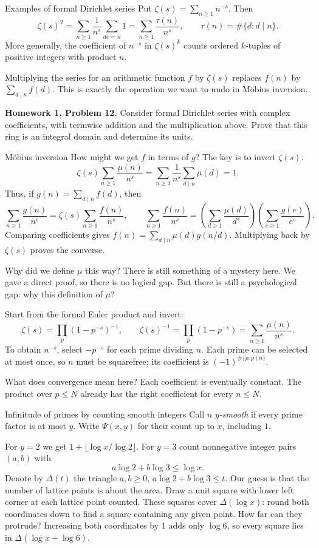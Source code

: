 \documentclass[aspectratio=169,11pt]{beamer}
\newcommand{\HW}[2]{{\color{teal}\textbf{Homework #1, Problem #2.}}}
\begin{document}
\begin{frame}{Examples of formal Dirichlet series}
Put $\zeta(s)=\sum_{n\ge1}n^{-s}$. Then
\[
\zeta(s)^2=\sum_{n\ge1}\frac1{n^s}\sum_{de=n}1
=\sum_{n\ge1}\frac{\tau(n)}{n^s},
\qquad \tau(n)=\#\{d:d\mid n\}.
\]
More generally, the coefficient of $n^{-s}$ in $\zeta(s)^k$ counts ordered $k$-tuples of positive integers with product $n$.

Multiplying the series for an arithmetic function $f$ by $\zeta(s)$ replaces $f(n)$ by $\sum_{d\mid n}f(d)$. This is exactly the operation we want to undo in M\"obius inversion.

\HW{1}{12} Consider formal Dirichlet series with complex coefficients, with termwise addition and the multiplication above. Prove that this ring is an integral domain and determine its units.
\end{frame}
\begin{frame}{M\"obius inversion}
How might we get $f$ in terms of $g$? The key is to invert $\zeta(s)$.
\[
\zeta(s)\sum_{n\ge1}\frac{\mu(n)}{n^s}
=\sum_{n\ge1}\frac1{n^s}\sum_{d\mid n}\mu(d)=1.
\]
Thus, if $g(n)=\sum_{d\mid n}f(d)$, then
\[
\sum_{n\ge1}\frac{g(n)}{n^s}=\zeta(s)\sum_{n\ge1}\frac{f(n)}{n^s},\qquad
\sum_{n\ge1}\frac{f(n)}{n^s}=\left(\sum_{d\ge1}\frac{\mu(d)}{d^s}\right)\left(\sum_{e\ge1}\frac{g(e)}{e^s}\right).
\]
Comparing coefficients gives $f(n)=\sum_{d\mid n}\mu(d)g(n/d)$. Multiplying back by $\zeta(s)$ proves the converse.
\end{frame}
\begin{frame}{Why did we define $\mu$ this way?}
There is still something of a mystery here. We gave a direct proof, so there is no logical gap. But there is still a psychological gap: why this definition of $\mu$?

Start from the formal Euler product and invert:
\[\zeta(s)=\prod_p(1-p^{-s})^{-1},\qquad
\zeta(s)^{-1}=\prod_p(1-p^{-s})=\sum_{n\ge1}\frac{\mu(n)}{n^s}.\]
To obtain $n^{-s}$, select $-p^{-s}$ for each prime dividing $n$. Each prime can be selected at most once, so $n$ must be squarefree; its coefficient is $(-1)^{\#\{p:p\mid n\}}$.

What does convergence mean here? Each coefficient is eventually constant. The product over $p\le N$ already has the right coefficient for every $n\le N$.
\end{frame}
\begin{frame}{Infinitude of primes by counting smooth integers}
Call $n$ \emph{$y$-smooth} if every prime factor is at most $y$. Write $\Psi(x,y)$ for their count up to $x$, including $1$.

For $y=2$ we get $1+\lfloor\log x/\log2\rfloor$. For $y=3$ count nonnegative integer pairs $(a,b)$ with
\[a\log2+b\log3\le\log x.\]
Denote by $\Delta(t)$ the triangle $a,b\ge0$, $a\log2+b\log3\le t$. Our guess is that the number of lattice points is about the area. Draw a unit square with lower left corner at each lattice point counted. These squares cover $\Delta(\log x)$: round both coordinates down to find a square containing any given point. How far can they protrude? Increasing both coordinates by $1$ adds only $\log6$, so every square lies in $\Delta(\log x+\log6)$.
\end{frame}
\end{document}
